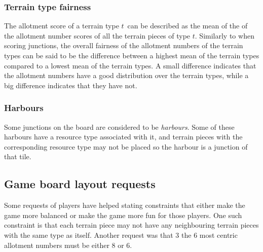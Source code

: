 \documentclass[a4paper,11pt]{article}
\begin{document}
\subsubsection{Terrain type fairness}
\label{sec:typeFairness}
The allotment score of a terrain type $t$~can be described as the mean of the of the allotment number scores of all the terrain pieces of type $t$. Similarly to when scoring junctions, the overall fairness of the allotment numbers of the terrain types can be said to be the difference between a highest mean of the terrain types compared to a lowest mean of the terrain types. A small difference indicates that the allotment numbers have a good distribution over the terrain types, while a big difference indicates that they have not.

\subsubsection{Harbours}
\label{sec:harbours}
Some junctions on the board are considered to be \textit{harbours}. Some of these harbours have a resource type associated with it, and terrain pieces with the corresponding resource type may not be placed so the harbour is a junction of that tile.

\subsection{Game board layout requests}
\label{sec:requests}
Some requests of players have helped stating constraints that either make the game more balanced or make the game more fun for those players. One such constraint is that each terrain piece may not have any neighbouring terrain pieces with the same type as itself. Another request was that 3 the 6 most centric allotment numbers must be either 8 or 6.
\end{document}
